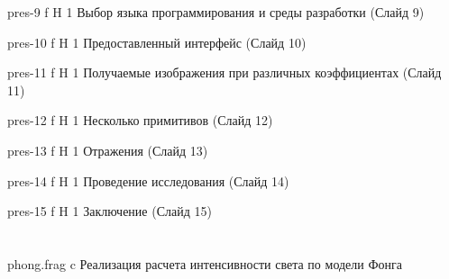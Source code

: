\begin{appendices}
	{pres-9} %
	{f} %
	{H} %
	{1\textwidth} %
	{Выбор языка программирования и среды разработки (Слайд 9)} %
	
	{pres-10} %
	{f} %
	{H} %
	{1\textwidth} %
	{Предоставленный интерфейс (Слайд 10)} %
	
	{pres-11} %
	{f} %
	{H} %
	{1\textwidth} %
	{Получаемые изображения при различных коэффициентах (Слайд 11)} %
	
	{pres-12} %
	{f} %
	{H} %
	{1\textwidth} %
	{Несколько примитивов (Слайд 12)} %
	
	{pres-13} %
	{f} %
	{H} %
	{1\textwidth} %
	{Отражения (Слайд 13)} %
	
	{pres-14} %
	{f} %
	{H} %
	{1\textwidth} %
	{Проведение исследования (Слайд 14)} %
	
	{pres-15} %
	{f} %
	{H} %
	{1\textwidth} %
	{Заключение (Слайд 15)} %
	
	
	
	\chapter{}
	{phong.frag} %
	{c} %
	{Реализация расчета интенсивности света по модели Фонга} %



\end{appendices}
